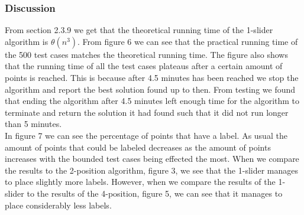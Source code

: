 \documentclass[crop=false,a4paper,oneside,11pt]{standalone}
\begin{document}
\subsubsection{Discussion}
From section 2.3.9 we get that the theoretical running time of the 1-slider algorithm is $\theta(n^3)$. From figure 6 we can see that the practical running time of the 500 test cases matches the theoretical running time. The figure also shows that the running time of all the test cases plateaus after a certain amount of points is reached. This is because after 4.5 minutes has been reached we stop the algorithm and report the best solution found up to then. From testing we found that ending the algorithm after 4.5 minutes left enough time for the algorithm to terminate and return the solution it had found such that it did not run longer than 5 minutes.\\
In figure 7 we can see the percentage of points that have a label. As usual the amount of points that could be labeled decreases as the amount of points increases with the bounded test cases being effected the most. When we compare the results to the 2-position algorithm, figure 3, we see that the 1-slider manages to place slightly more labels. However, when we compare the results of the 1-slider to the results of the 4-position, figure 5, we can see that it manages to place considerably less labels.
\end{document}

